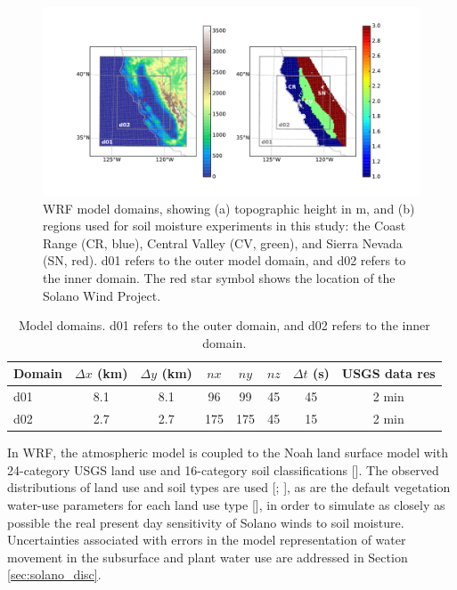 \begin{figure}[here]
\includegraphics[width=1\textwidth]{ch3-wind/img/domain_map_cropped.pdf}
\caption{WRF model domains, showing (a) topographic height in m, and (b) regions used for soil moisture experiments in this study: the Coast Range (CR, blue), Central Valley (CV, green), and Sierra Nevada (SN, red). d01 refers to the outer model domain, and d02 refers to the inner domain.  The red star symbol shows the location of the Solano Wind Project.}
\label{fig:windSol_domainmap}
\end{figure}

\begin{table}
\begin{tabular}{ l c c c c c c c }
\hline
Domain & $\Delta x$ (km) & $\Delta y$ (km) & $nx$ & $ny$ & $nz$ & $\Delta t$ (s) & USGS data res \\ \hline
d01 & 8.1 & 8.1 & 96 & 99 & 45 & 45 & 2 min\\
d02 & 2.7 & 2.7 & 175 & 175 & 45 & 15 & 2 min\\
\hline
\end{tabular}
\caption{Model domains. d01 refers to the outer domain, and d02 refers to the inner domain.}
\label{table:windSol_domains}
\end{table}

In WRF, the atmospheric model is coupled to the Noah land surface model with 24-category USGS land use and 16-category soil classifications [\cite{skamarock2008}].  The observed distributions of land use and soil types are used [\cite{eidenshink19941}; \cite{miller1998conterminous}], as are the default vegetation water-use parameters for each land use type [\cite{skamarock2008}], in order to simulate as closely as possible the real present day sensitivity of Solano winds to soil moisture.  Uncertainties associated with errors in the model representation of water movement in the subsurface and plant water use are addressed in Section \ref{sec:solano_disc}. 

